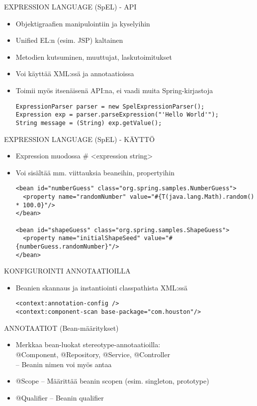 \documentclass[hyperref={pdfauthor=\AUTHOR},14pt]{beamer}
\begin{document}
\begin{frame}[t, fragile]{EXPRESSION LANGUAGE (SpEL) - API}
\begin{itemize}
 \item Objektigraafien manipulointiin ja kyselyihin
 \item Unified EL:n (esim. JSP) kaltainen
 \item Metodien kutsuminen, muuttujat, laskutoimitukset
 \item Voi käyttää XML:ssä ja annotaatioissa
 \item Toimii myös itsenäisenä API:na, ei vaadi muita Spring-kirjastoja  
\begin{lstlisting}[style=Java]
ExpressionParser parser = new SpelExpressionParser();
Expression exp = parser.parseExpression("'Hello World'");
String message = (String) exp.getValue();
\end{lstlisting}
\end{itemize}
\end{frame}
\begin{frame}[t, fragile]{EXPRESSION LANGUAGE (SpEL) - KÄYTTÖ }
\begin{itemize}
 \item Expression muodossa \#{ <expression string> }
 \item Voi sisältää mm. viittauksia beaneihin, propertyihin 
\begin{lstlisting}
<bean id="numberGuess" class="org.spring.samples.NumberGuess">
  <property name="randomNumber" value="#{T(java.lang.Math).random() * 100.0}"/>
</bean>

<bean id="shapeGuess" class="org.spring.samples.ShapeGuess">
  <property name="initialShapeSeed" value="#{numberGuess.randomNumber}"/>
</bean>
\end{lstlisting}
\end{itemize}
\end{frame}
\begin{frame}[t, fragile]{KONFIGUROINTI ANNOTAATIOILLA}
\begin{itemize}
 \item Beanien skannaus ja instantiointi classpathista XML:ssä
\begin{lstlisting}
<context:annotation-config />
<context:component-scan base-package="com.houston"/>
\end{lstlisting}
\end{itemize}
\end{frame}
\begin{frame}[t, fragile]{ANNOTAATIOT (Bean-määritykset)}
\begin{itemize}
 \item Merkkaa bean-luokat stereotype-annotaatioilla:\\
 @Component, @Repository, @Service, @Controller\\
 -- Beanin nimen voi myös antaa\\
 \item @Scope
 -- Määrittää beanin scopen (esim. singleton, prototype)
 \item @Qualifier
 -- Beanin qualifier
\end{itemize}
\end{frame}
\end{document}
